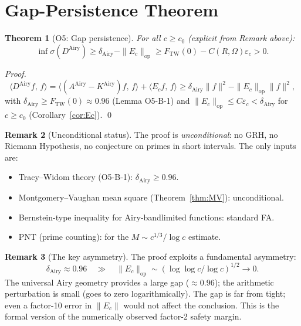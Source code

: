 \documentclass[12pt,a4paper]{amsart}
\newtheorem{theorem}{Theorem}[section]
\theoremstyle{definition}
\newtheorem{remark}[theorem]{Remark}
\newcommand{\KAi}{K^{\mathrm{Airy}}}
\newcommand{\DAi}{D^{\mathrm{Airy}}}
\newcommand{\AAiry}{A^{\mathrm{Airy}}}
\newcommand{\norm}[1]{\|#1\|}
\newcommand{\ip}[2]{\langle #1,\, #2\rangle}
\newcommand{\Ec}{E_c}
\begin{document}
\section{Gap-Persistence Theorem}
\label{sec:main}

\begin{theorem}[O5: Gap persistence]\label{thm:O5}
For all $c \ge c_0$ (explicit from Remark above):
\begin{equation}
  \inf\sigma(\DAi)
  \ge \delta_{\mathrm{Airy}} - \norm{\Ec}_{\mathrm{op}}
  \ge F_{\mathrm{TW}}(0) - C(R,\Omega)\varepsilon_c
  > 0.
\end{equation}
\end{theorem}

\begin{proof}
\[
  \ip{\DAi f}{f}
  = \ip{(\AAiry - \KAi)f}{f} + \ip{\Ec f}{f}
  \ge \delta_{\mathrm{Airy}}\norm{f}^2 - \norm{\Ec}_{\mathrm{op}}\norm{f}^2,
\]
with $\delta_{\mathrm{Airy}} \ge F_{\mathrm{TW}}(0) \approx 0.96$
(Lemma O5-B-1) and $\norm{\Ec}_{\mathrm{op}} \le C\varepsilon_c < \delta_{\mathrm{Airy}}$
for $c \ge c_0$ (Corollary~\ref{cor:Ec}).
\qed
\end{proof}

\begin{remark}[Unconditional status]
The proof is \emph{unconditional}: no GRH, no Riemann Hypothesis,
no conjecture on primes in short intervals.
The only inputs are:
\begin{itemize}
  \item Tracy--Widom theory (O5-B-1): $\delta_{\mathrm{Airy}} \ge 0.96$.
  \item Montgomery--Vaughan mean square (Theorem~\ref{thm:MV}): unconditional.
  \item Bernstein-type inequality for Airy-bandlimited functions: standard FA.
  \item PNT (prime counting): for the $M \sim c^{1/3}/\log c$ estimate.
\end{itemize}
\end{remark}

\begin{remark}[The key asymmetry]
The proof exploits a fundamental asymmetry:
\[
  \delta_{\mathrm{Airy}} \approx 0.96
  \quad\gg\quad
  \norm{\Ec}_{\mathrm{op}} \sim (\log\log c/\log c)^{1/2} \to 0.
\]
The universal Airy geometry provides a large gap ($\approx 0.96$);
the arithmetic perturbation is small (goes to zero logarithmically).
The gap is far from tight; even a factor-10 error in $\norm{\Ec}$ would not affect the conclusion.
This is the formal version of the numerically observed factor-2 safety margin.
\end{remark}
\end{document}
